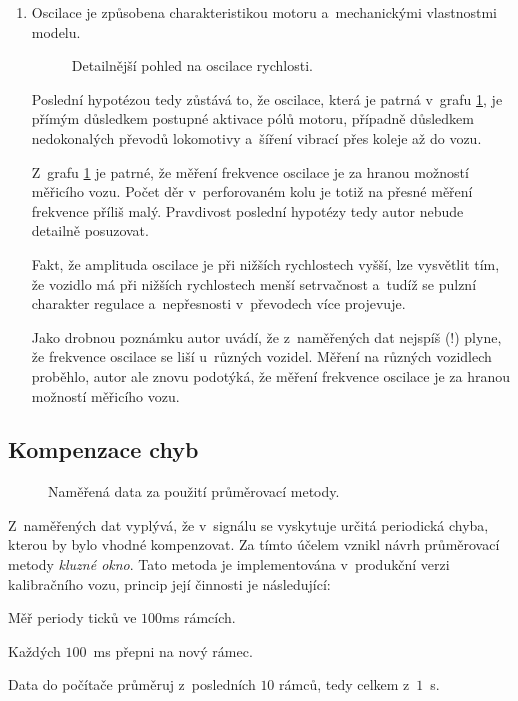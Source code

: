\begin{enumerate}
\item Oscilace je způsobena charakteristikou motoru a~mechanickými vlastnostmi
modelu.

\begin{figure}[ht]

\caption{Detailnější pohled na oscilace rychlosti.}
\label{fig:speed-presny}
\end{figure}

Poslední hypotézou tedy zůstává to, že oscilace, která je patrná v~grafu
\ref{fig:speed-presny}, je přímým důsledkem postupné aktivace pólů motoru,
případně důsledkem nedokonalých převodů lokomotivy a~šíření vibrací přes koleje
až do vozu.

Z~grafu \ref{fig:speed-presny} je patrné, že měření frekvence oscilace je za
hranou možností měřicího vozu. Počet děr v~perforovaném kolu je totiž na přesné
měření frekvence příliš malý. Pravdivost poslední hypotézy tedy autor nebude
detailně posuzovat.

Fakt, že amplituda oscilace je při nižších rychlostech vyšší, lze vysvětlit
tím, že vozidlo má při nižších rychlostech menší setrvačnost a~tudíž se pulzní
charakter regulace a~nepřesnosti v~převodech více projevuje.

Jako drobnou poznámku autor uvádí, že z~naměřených dat nejspíš (!) plyne,
že frekvence oscilace se liší u~různých vozidel. Měření na různých vozidlech
proběhlo, autor ale znovu podotýká, že měření frekvence oscilace je za hranou
možností měřicího vozu.

\end{enumerate}

\subsection{Kompenzace chyb}
\label{subsec:wsm-kompenzace}

\begin{figure}[ht]

\caption{Naměřená data za použití průměrovací metody.}
\label{fig:prumer}
\end{figure}

Z~naměřených dat vyplývá, že v~signálu se vyskytuje určitá periodická chyba,
kterou by bylo vhodné kompenzovat. Za tímto účelem vznikl návrh průměrovací
metody \textit{kluzné okno}. Tato metoda je implementována v~produkční verzi
kalibračního vozu, princip její činnosti je následující:

\begin{compactenum}
\item Měř periody ticků ve $100$ms rámcích.
\item Každých $100$~ms přepni na nový rámec.
\item Data do počítače průměruj z~posledních $10$ rámců, tedy celkem z~$1$~s.
\end{compactenum}

